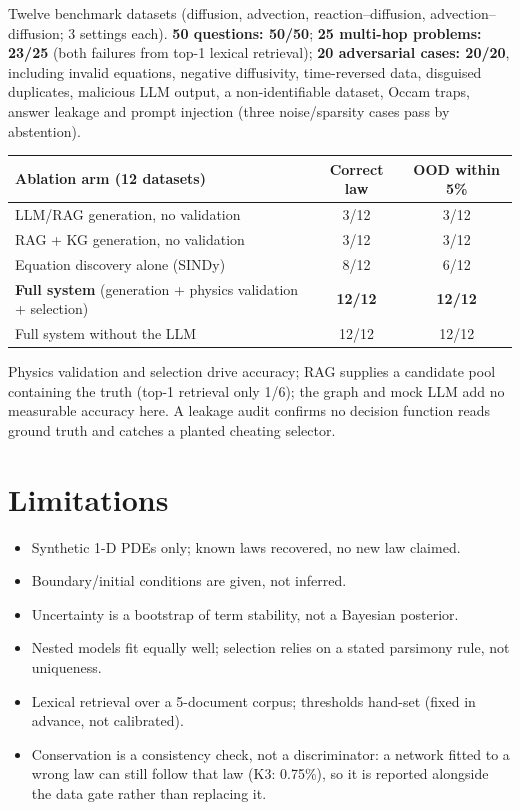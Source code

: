 \documentclass[11pt,a4paper]{article}
\begin{document}
Twelve benchmark datasets (diffusion, advection, reaction--diffusion, advection--diffusion; 3 settings each).
\textbf{50 questions: 50/50}; \textbf{25 multi-hop problems: 23/25} (both failures from top-1 lexical retrieval);
\textbf{20 adversarial cases: 20/20}, including invalid equations, negative diffusivity, time-reversed data, disguised
duplicates, malicious LLM output, a non-identifiable dataset, Occam traps, answer leakage and prompt injection (three
noise/sparsity cases pass by abstention).

\begin{center}
\small
\begin{tabular}{@{}lcc@{}}
\toprule
\textbf{Ablation arm} (12 datasets) & \textbf{Correct law} & \textbf{OOD within 5\%} \\ \midrule
LLM/RAG generation, no validation & 3/12 & 3/12 \\
RAG + KG generation, no validation & 3/12 & 3/12 \\
Equation discovery alone (SINDy) & 8/12 & 6/12 \\
\textbf{Full system} (generation + physics validation + selection) & \textbf{12/12} & \textbf{12/12} \\
Full system without the LLM & 12/12 & 12/12 \\
\bottomrule
\end{tabular}
\end{center}
Physics validation and selection drive accuracy; RAG supplies a candidate pool containing the truth (top-1 retrieval
only 1/6); the graph and mock LLM add no measurable accuracy here. A leakage audit confirms no decision function
reads ground truth and catches a planted cheating selector.

\section{Limitations}
\begin{itemize}
  \item Synthetic 1-D PDEs only; known laws recovered, no new law claimed.
  \item Boundary/initial conditions are given, not inferred.
  \item Uncertainty is a bootstrap of term stability, not a Bayesian posterior.
  \item Nested models fit equally well; selection relies on a stated parsimony rule, not uniqueness.
  \item Lexical retrieval over a 5-document corpus; thresholds hand-set (fixed in advance, not calibrated).
  \item Conservation is a consistency check, not a discriminator: a network fitted to a wrong law can still follow
        that law (K3: 0.75\%), so it is reported alongside the data gate rather than replacing it.
\end{itemize}
\end{document}
